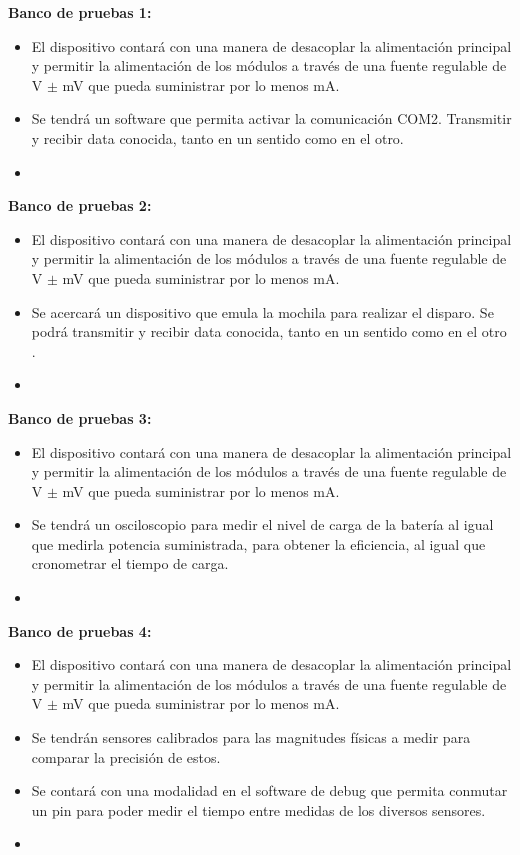 \textbf{Banco de pruebas 1:}
\begin{itemize}
	\item El dispositivo contará con una manera de desacoplar la alimentación principal y permitir la alimentación de los módulos a través de una fuente regulable de \TBD V $\pm$ \TBD mV que pueda suministrar por lo menos \TBD mA.
	\item Se tendrá un software que permita activar  la comunicación COM2. Transmitir y recibir data conocida, tanto en un sentido como en el otro.
	\item \TBC
\end{itemize}

\textbf{Banco de pruebas 2:}
\begin{itemize}
	\item El dispositivo contará con una manera de desacoplar la alimentación principal y permitir la alimentación de los módulos a través de una fuente regulable de \TBD V $\pm$ \TBD mV que pueda suministrar por lo menos \TBD mA.
	\item Se acercará un dispositivo que emula la mochila para realizar el disparo. Se podrá transmitir y recibir data conocida, tanto en un sentido como en el otro \TBC.
	\item \TBC
\end{itemize}

\textbf{Banco de pruebas 3:}
\begin{itemize}
	\item El dispositivo contará con una manera de desacoplar la alimentación principal y permitir la alimentación de los módulos a través de una fuente regulable de \TBD V $\pm$ \TBD mV que pueda suministrar por lo menos \TBD mA.
	\item Se tendrá un osciloscopio para medir el nivel de carga de la batería al igual que medirla potencia suministrada, para obtener la eficiencia, al igual que cronometrar el tiempo de carga.
	\item \TBC
\end{itemize}

\textbf{Banco de pruebas 4:}
\begin{itemize}
	\item El dispositivo contará con una manera de desacoplar la alimentación principal y permitir la alimentación de los módulos a través de una fuente regulable de \TBD V $\pm$ \TBD mV que pueda suministrar por lo menos \TBD mA.
	\item Se tendrán sensores calibrados para las magnitudes físicas a medir para comparar la precisión de estos.
	\item Se contará con una modalidad en el software de debug que permita conmutar un pin para poder medir el tiempo entre medidas de los diversos sensores.
	\item \TBC
\end{itemize}

